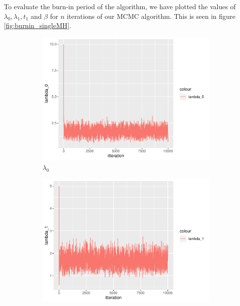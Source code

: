 To evaluate the burn-in period of the algorithm, we have plotted the values of $\lambda_0, \lambda_1, t_1$ and $\beta$ for $n$ iterations of our MCMC algorithm. This is seen in figure \ref{fig:burnin_singleMH}. 


\begin{figure}
    \centering
    \begin{subfigure}[b]{0.49\textwidth}
        \centering
        \includegraphics[width = \textwidth]{Images/sim_lambda0.pdf}
        \caption{$\lambda_0$}
        \label{fig:burnin_lam0}
    \end{subfigure}
    \begin{subfigure}[b]{0.49\textwidth}
        \centering
        \includegraphics[width = \textwidth]{Images/sim_lambda1.pdf}

\end{subfigure}
\end{figure}
